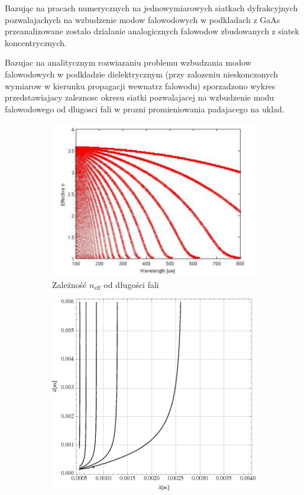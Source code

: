 Bazując na pracach numerycznych na jednowymiarowych siatkach dyfrakcyjnych pozwalajachych na wzbudzenie modow falowodowych w podkladach z GaAs przeanalizowane zostalo dzialanie analogicznych falowodow zbudowanych z siatek koncentrycznych. 

Bazujac na analitycznym rozwiazaniu problemu wzbudzania modow falowodowych w podkladzie dielektrycznym (przy zalozeniu nieskonczonych wymiarow w kierunku propagacji wewnatrz falowodu) sporzadzono wykres przedstawiajacy zaleznosc okresu siatki pozwalajacej na wzbudzenie modu falowodowego od dlugosci fali w prozni promieniowania padajacego na uklad.

\begin{figure}
\begin{subfigure}{0.5\textwidth}
        \includegraphics[width=\textwidth]{pomocnicze/thz/gaas-neffeps.png}
	\caption{Zależność $n_{\textrm{eff}}$ od długości fali}
	\label{fig:gaas-effn}
\end{subfigure}
\begin{subfigure}{0.5\textwidth}
        \includegraphics[width=\textwidth]{images/antenaThz/d_lambda.png}

\end{subfigure}
\end{figure}
